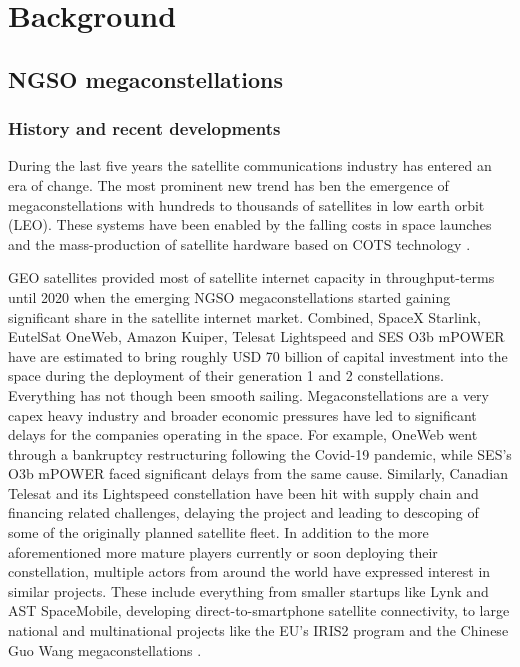 \documentclass[english, 12pt, a4paper, elec, utf8, a-1b, online]{aaltothesis}
\begin{document}
\clearpage

\section{Background}

\subsection{NGSO megaconstellations}
\subsubsection{History and recent developments}
During the last five years the satellite communications industry has entered an era of change.
The most prominent new trend has ben the emergence of megaconstellations with hundreds to thousands of satellites in low earth orbit (LEO).
These systems have been enabled by the falling costs in space launches and the mass-production of satellite hardware based on COTS technology \cite{portillo2019technical}.

GEO satellites provided most of satellite internet capacity in throughput-terms until 2020 when the emerging NGSO megaconstellations started gaining significant share in the satellite internet market.
Combined, SpaceX Starlink, EutelSat OneWeb, Amazon Kuiper, Telesat Lightspeed and SES O3b mPOWER have are estimated to bring roughly USD 70 billion of capital investment into the space during the deployment of their generation 1 and 2 constellations.
Everything has not though been smooth sailing.
Megaconstellations are a very capex heavy industry and broader economic pressures have led to significant delays for the companies operating in the space.
For example, OneWeb went through a bankruptcy restructuring following the Covid-19 pandemic, while SES's O3b mPOWER faced significant delays from the same cause.
Similarly, Canadian Telesat and its Lightspeed constellation have been hit with supply chain and financing related challenges, delaying the project and leading to descoping of some of the originally planned satellite fleet.
In addition to the more aforementioned more mature players currently or soon deploying their constellation, multiple actors from around the world have expressed interest in similar projects.
These include everything from smaller startups like Lynk and AST SpaceMobile, developing direct-to-smartphone satellite connectivity, to large national and multinational projects like the EU’s IRIS2 program and the Chinese Guo Wang megaconstellations \cite{euroconsult-ngso-tracker-2023-q3}.
\end{document}
